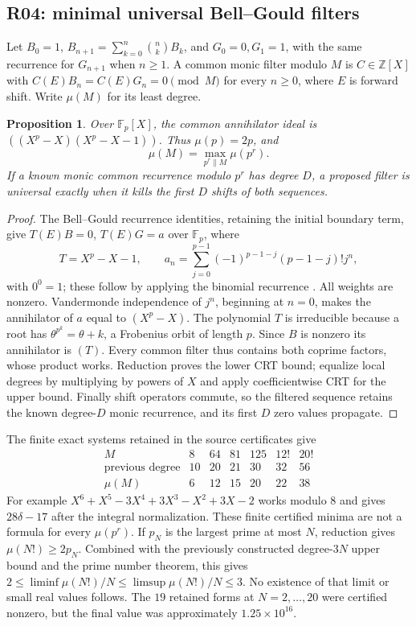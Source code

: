 \documentclass[11pt,a4paper]{article}
\newcommand{\Z}{\mathbb Z}
\newtheorem{proposition}[theorem]{Proposition}
\theoremstyle{definition}
\theoremstyle{remark}
\numberwithin{equation}{section}
\begin{document}
\subsection{R04: minimal universal Bell--Gould filters}
Let $B_0=1$, $B_{n+1}=\sum_{k=0}^n\binom nkB_k$, and
$G_0=0,G_1=1$, with the same recurrence for $G_{n+1}$ when $n\ge1$.
A common monic filter modulo $M$ is $C\in\Z[X]$ with
$C(E)B_n=C(E)G_n=0\pmod M$ for every $n\ge0$, where $E$ is forward
shift.  Write $\mu(M)$ for its least degree.

\begin{proposition}\label{ar:bellgould}
Over $\mathbb F_p[X]$, the common annihilator ideal is
$((X^p-X)(X^p-X-1))$.  Thus $\mu(p)=2p$, and
\[
 \mu(M)=\max_{p^r\parallel M}\mu(p^r).
\]
If a known monic common recurrence modulo $p^r$ has degree $D$, a proposed
filter is universal exactly when it kills the first $D$ shifts of both
sequences.
\end{proposition}
\begin{proof}
The Bell--Gould recurrence identities, retaining the initial boundary term,
give $T(E)B=0$, $T(E)G=a$ over $\mathbb F_p$, where
\[
 T=X^p-X-1,\qquad
 a_n=\sum_{j=0}^{p-1}(-1)^{p-1-j}(p-1-j)!j^n,
\]
with $0^0=1$; these follow by applying the binomial recurrence
\cite{ar:Gould}.  All weights are nonzero.  Vandermonde independence of
$j^n$, beginning at $n=0$, makes the annihilator of $a$ equal to
$(X^p-X)$.  The polynomial $T$ is irreducible because a root has
$\theta^{p^k}=\theta+k$, a Frobenius orbit of length $p$.  Since $B$ is
nonzero its annihilator is $(T)$.  Every common filter thus contains both
coprime factors, whose product works.
Reduction proves the lower CRT bound; equalize local degrees by multiplying
by powers of $X$ and apply coefficientwise CRT for the upper bound.
Finally shift operators commute, so the filtered sequence retains the
known degree-$D$ monic recurrence, and its first $D$ zero values propagate.
\end{proof}
The finite exact systems retained in the source certificates give
\[
\begin{array}{c|rrrrrr}
M&8&64&81&125&12!&20!\\\hline
\text{previous degree}&10&20&21&30&32&56\\
\mu(M)&6&12&15&20&22&38
\end{array}
\]
For example $X^6+X^5-3X^4+3X^3-X^2+3X-2$ works modulo $8$ and gives
$28\delta-17$ after the integral normalization.  These finite certified
minima are not a formula for every $\mu(p^r)$.
If $p_N$ is the largest prime at most $N$, reduction gives
$\mu(N!)\ge2p_N$.  Combined with the previously constructed degree-$3N$
upper bound and the prime number theorem, this gives
$2\le\liminf\mu(N!)/N\le\limsup\mu(N!)/N\le3$.
No existence of that limit or small real values follows.  The $19$ retained
forms at $N=2,\ldots,20$ were certified nonzero, but the final value was
approximately $1.25\times10^{16}$.
\end{document}
